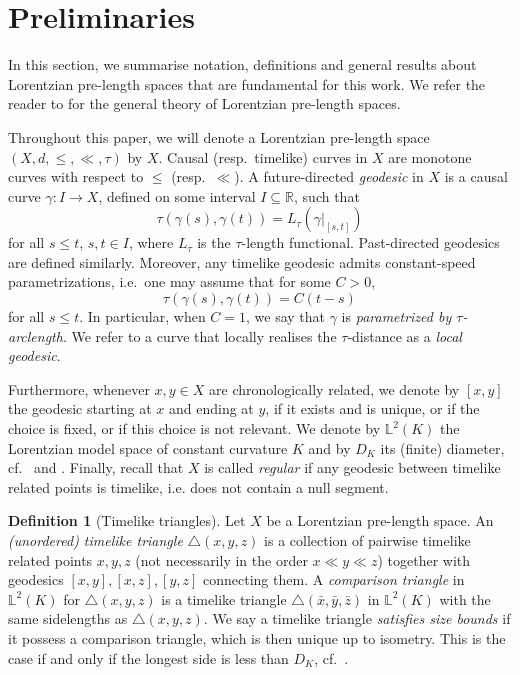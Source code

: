 \documentclass[11pt,reqno]{amsart}
\theoremstyle{definition}
\theoremstyle{definition}
\newtheorem{dfn}{Definition}[section]
\theoremstyle{plain}
\theoremstyle{remark}
\newcommand{\LpLS}{Lorentzian pre-length space }
\newcommand{\LpLSn}{Lorentzian pre-length space}
\newcommand{\lm}[1]{\mathbb{L}^2(#1)}
\begin{document}
\section{Preliminaries}\label{s:preliminaries}
In this section, we summarise notation, definitions and general results about Lorentzian pre-length spaces that are fundamental for this work. We refer the reader to \cite{kunzinger-saemann2018} for the general theory of Lorentzian pre-length spaces.

Throughout this paper, we will denote a \LpLS $(X,d,\leq,\ll,\tau)$ by $X$. Causal (resp.\ timelike) curves in $X$ are monotone curves with respect to $\leq$ (resp.\ $\ll$). A future-directed \textit{geodesic} in $X$ is a causal curve $\gamma \colon I\to X$, defined on some interval $I\subseteq \mathbb{R}$, such that
\[
\tau(\gamma(s),\gamma(t)) = L_\tau(\gamma|_{[s,t]})
\]
for all $s\leq t$, $s,t\in I$, where $L_{\tau}$ is the $\tau$-length functional. Past-directed geodesics are defined similarly. Moreover, any timelike geodesic admits constant-speed parametrizations, i.e.\ one may assume that for some $C > 0$, 
\[
\tau(\gamma(s),\gamma(t)) = C(t-s) 
\] 
for all $s\leq t$. In particular, when $C=1$, we say that $\gamma$ is \textit{parametrized by $\tau$-arclength}. 
We refer to a curve that locally realises the $\tau$-distance as a \emph{local geodesic}. 


Furthermore, whenever $x,y\in X$ are chronologically related, we denote by $[x,y]$ the geodesic  
starting at  $x$ and ending at $y$, if it exists and is unique, or if the choice is fixed, or if this choice is not relevant. 
We denote by $\lm{K}$ the Lorentzian model space of constant curvature $K$ and by $D_K$ its (finite) diameter, cf.\ \cite[Definition 4.5]{kunzinger-saemann2018} and \cite[Definition 2.6]{BNR25}. 
Finally, recall that $X$ is called \emph{regular} if any geodesic between timelike related points is timelike, i.e. does not contain a null segment. 


\begin{dfn}[Timelike triangles]
Let $X$ be a \LpLSn. An \emph{(unordered) timelike triangle} $\triangle(x,y,z)$ is a collection of pairwise timelike related points $x,y,z$ (not necessarily in the order $x\ll y\ll z$) together with geodesics $[x,y],[x,z],[y,z]$ connecting them. A \emph{comparison triangle} in $\lm{K}$ for $\triangle(x,y,z)$ is a timelike triangle $\triangle(\bar{x},\bar{y},\bar{z})$ in $\lm{K}$ with the same sidelengths as $\triangle(x,y,z)$.
We say a timelike triangle \emph{satisfies size bounds} if it possess a comparison triangle, which is then unique up to isometry.
This is the case if and only if the longest side is less than $D_K$, cf.\ \cite[Lemma 4.6]{kunzinger-saemann2018}. 
\end{dfn}
\end{document}
